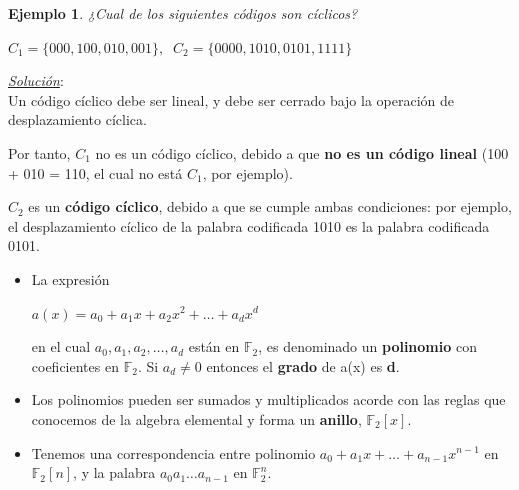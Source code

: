 \documentclass{beamer}
\theoremstyle{plain}
\theoremstyle{example}
\theoremstyle{example}
\newtheorem{ejemplo} [Ejemplo] {Ejemplo}
\begin{document}
\begin{frame}  \small  

\begin{ejemplo}
¿Cual de los siguientes códigos son cíclicos? 

\begin{center}
$C_1 =\{000,100,010,001\}, \;\;	C_2 =\{0000,1010,0101,1111\}$
\end{center}
\end{ejemplo}


\textit{\underline{Solución}}:\\
\vspace*{15pt}
Un código cíclico debe ser lineal, y debe ser cerrado bajo la operación de desplazamiento cíclica. 

Por tanto, $C_1$ no es un código cíclico, debido a que \textbf{no es un código lineal} (100 + 010 = 110, el cual no está $C_1$, por ejemplo).\\
\vspace*{10pt}

$C_2$ es un \textbf{código cíclico}, debido a que se cumple ambas condiciones: por ejemplo, el desplazamiento cíclico de la palabra codificada 1010 es la palabra codificada 0101.

\end{frame} 

\begin{frame}  \footnotesize
\begin{itemize} 

\item La expresión

\begin{center}
$a(x) = a_0 +a_1x+a_2x^2 + \ldots +a_dx^d$
\end{center}

en el cual $ a_0,a_1,a_2, \ldots, a_d$ están en $\mathbb{F}_2$, es denominado un \textbf{polinomio} con coeficientes en $\mathbb{F}_2$. Si $a_d \neq 0$ entonces el \textbf{grado} de a(x) es \textbf{d}. 

\item Los polinomios pueden ser sumados y multiplicados acorde con las reglas que conocemos de la algebra elemental y forma un \textbf{anillo}, $\mathbb{F}_2[x]$.

\item Tenemos una correspondencia entre polinomio $a_0 + a_1x +\ldots + a_{n-1} x^{n-1}$ en $\mathbb{F}_2[n]$, y la palabra $a_0 a_1\ldots a_{n-1}$ en $\mathbb{F}_2^n$.




\end{itemize} \end{frame} 
\end{document}
